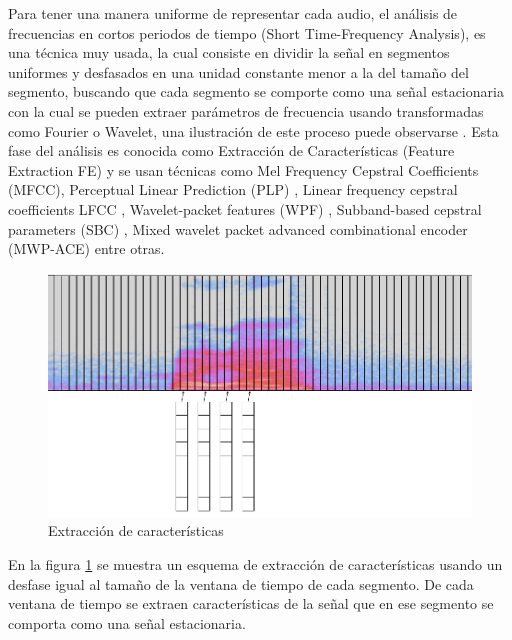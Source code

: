 Para tener una manera uniforme de representar cada audio, el análisis de frecuencias en cortos periodos de tiempo (Short Time-Frequency Analysis), es una técnica muy usada, la cual consiste en dividir la señal en segmentos uniformes y desfasados en una unidad constante menor a la del tamaño del segmento, buscando que cada segmento se comporte como una señal estacionaria con la cual se pueden extraer parámetros de frecuencia usando transformadas como Fourier o Wavelet, una ilustración de este proceso puede observarse . Esta fase del análisis es conocida como Extracción de Características (Feature Extraction FE) y se usan técnicas como Mel Frequency Cepstral Coefficients (MFCC)\cite{Davis1980ComparisonSentences}, Perceptual Linear Prediction (PLP) \cite{Hermansky1990PerceptualSpeech}, Linear frequency cepstral coefficients LFCC \cite{Davis1980ComparisonSentences}, Wavelet-packet features (WPF) \cite{Farooq2001MelRecognition}, Subband-based cepstral parameters (SBC) \cite{Sarikaya98waveletpacket}, Mixed wavelet packet advanced combinational encoder (MWP-ACE) \cite{NogueiraWaveletImplants} entre otras.

\begin{figure}[H]

\centering
\caption{Extracción de características}
\label{img:fe}
\includegraphics[scale=0.50]{images/fe.png}
\end{figure}

En la figura \ref{img:fe} se muestra un esquema de extracción de características usando un desfase igual al tamaño de la ventana de tiempo de cada segmento. De cada ventana de tiempo se extraen características de la señal que en ese segmento se comporta como una señal estacionaria.

